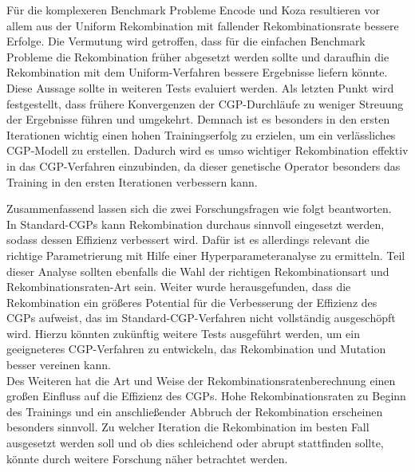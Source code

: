 Für die komplexeren Benchmark Probleme Encode und Koza resultieren vor allem aus der Uniform Rekombination mit fallender Rekombinationsrate bessere Erfolge.
Die Vermutung wird getroffen, dass für die einfachen Benchmark Probleme die Rekombination früher abgesetzt werden sollte und daraufhin die Rekombination mit dem Uniform-Verfahren bessere Ergebnisse liefern könnte.
Diese Aussage sollte in weiteren Tests evaluiert werden.
Als letzten Punkt wird festgestellt, dass frühere Konvergenzen der CGP-Durchläufe zu weniger Streuung der Ergebnisse führen und umgekehrt.
Demnach ist es besonders in den ersten Iterationen wichtig einen hohen Trainingserfolg zu erzielen, um ein verlässliches CGP-Modell zu erstellen.
Dadurch wird es umso wichtiger Rekombination effektiv in das CGP-Verfahren einzubinden, da dieser genetische Operator besonders das Training in den ersten Iterationen verbessern kann.

Zusammenfassend lassen sich die zwei Forschungsfragen wie folgt beantworten.\\
In Standard-CGPs kann Rekombination durchaus sinnvoll eingesetzt werden, sodass dessen Effizienz verbessert wird.
Dafür ist es allerdings relevant die richtige Parametrierung mit Hilfe einer Hyperparameteranalyse zu ermitteln.
Teil dieser Analyse sollten ebenfalls die Wahl der richtigen Rekombinationsart und Rekombinationsraten-Art sein.
Weiter wurde herausgefunden, dass die Rekombination ein größeres Potential für die Verbesserung der Effizienz des CGPs aufweist, das im Standard-CGP-Verfahren nicht vollständig ausgeschöpft wird.
Hierzu könnten zukünftig weitere Tests ausgeführt werden, um ein geeigneteres CGP-Verfahren zu entwickeln, das Rekombination und Mutation besser vereinen kann.\\
Des Weiteren hat die Art und Weise der Rekombinationsratenberechnung einen großen Einfluss auf die Effizienz des CGPs. 
Hohe Rekombinationsraten zu Beginn des Trainings und ein anschließender Abbruch der Rekombination erscheinen besonders sinnvoll.
Zu welcher Iteration die Rekombination im besten Fall ausgesetzt werden soll und ob dies schleichend oder abrupt stattfinden sollte, könnte durch weitere Forschung näher betrachtet werden.
